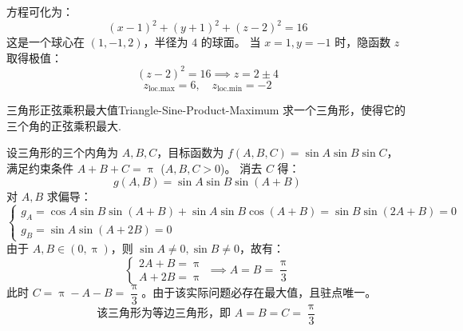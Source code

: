 \begin{solution}
    方程可化为：
    \begin{equation}
        (x - 1)^2 + (y + 1)^2 + (z - 2)^2 = 16
    \end{equation}
    这是一个球心在 $(1, -1, 2)$，半径为 $4$ 的球面。
    当 $x = 1, y = -1$ 时，隐函数 $z$ 取得极值：
    \begin{equation}
        (z - 2)^2 = 16 \implies z = 2 \pm 4
    \end{equation}
    \begin{equation}
        \boxed{z_{\text{loc.max}} = 6, \quad z_{\text{loc.min}} = -2}
    \end{equation}
\end{solution}

\begin{problem}{三角形正弦乘积最大值}{Triangle-Sine-Product-Maximum}
    求一个三角形，使得它的三个角的正弦乘积最大.
\end{problem}

\begin{solution}
    设三角形的三个内角为 $A, B, C$，目标函数为 $f(A, B, C) = \sin A \sin B \sin C$，满足约束条件 $A + B + C = \uppi$ ($A, B, C > 0$)。
    消去 $C$ 得：
    \begin{equation}
        g(A, B) = \sin A \sin B \sin(A + B)
    \end{equation}
    对 $A, B$ 求偏导：
    \begin{equation}
        \begin{cases}
            g_A = \cos A \sin B \sin(A+B) + \sin A \sin B \cos(A+B) = \sin B \sin(2A+B) = 0 \\
            g_B = \sin A \sin(A+2B) = 0
        \end{cases}
    \end{equation}
    由于 $A, B \in (0, \uppi)$，则 $\sin A \neq 0, \sin B \neq 0$，故有：
    \begin{equation}
        \begin{cases}
            2A + B = \uppi \\
            A + 2B = \uppi
        \end{cases} \implies A = B = \frac{\uppi}{3}
    \end{equation}
    此时 $C = \uppi - A - B = \dfrac{\uppi}{3}$。由于该实际问题必存在最大值，且驻点唯一。
    \begin{equation}
        \boxed{\text{该三角形为等边三角形，即 } A = B = C = \frac{\uppi}{3}}
    \end{equation}
\end{solution}


